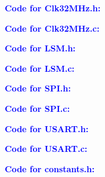 \documentclass[11pt]{article}
\theoremstyle{plain}
\theoremstyle{definition}
\begin{document}
%
%
\newpage
%
%
\textbf{\textcolor{blue}{Code for Clk\textunderscore 32MHz.h:}}

\newpage
\textbf{\textcolor{blue}{Code for Clk\textunderscore 32MHz.c:}}

%
%
\newpage
\textbf{\textcolor{blue}{Code for LSM.h:}}

\newpage
\textbf{\textcolor{blue}{Code for LSM.c:}}

%
%
\newpage
\textbf{\textcolor{blue}{Code for SPI.h:}}

\newpage
\textbf{\textcolor{blue}{Code for SPI.c:}}

%
%
\newpage
\textbf{\textcolor{blue}{Code for USART.h:}}

\newpage
\textbf{\textcolor{blue}{Code for USART.c:}}

%
%
%
\newpage
\textbf{\textcolor{blue}{Code for constants.h:}}

\end{document}

